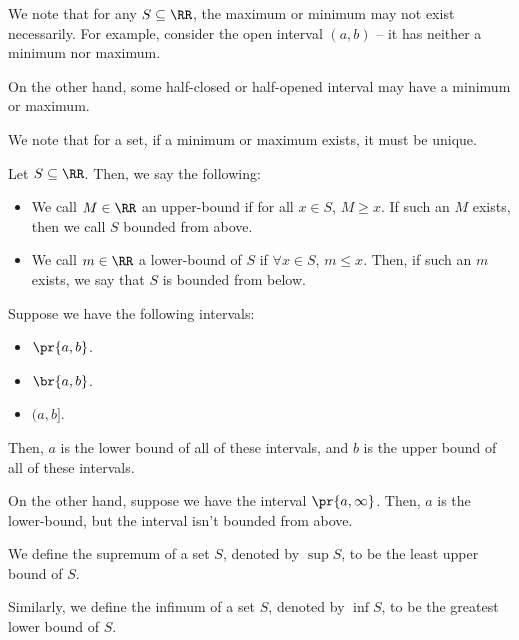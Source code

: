 \documentclass[openany]{book}
\begin{document}
\begin{rmk}
	We note that for any $S \subseteq \RR$, the maximum or minimum may not exist necessarily. For example, consider the open interval $(a,b)$ -- it has neither a minimum nor maximum.
	
	On the other hand, some half-closed or half-opened interval may have a minimum or maximum.
\end{rmk}

\begin{rmk}
	We note that for a set, if a minimum or maximum exists, it must be unique.
\end{rmk}

\begin{defn}
	Let $S \subseteq \RR$. Then, we say the following:
	\begin{itemize}
		\item We call $M \in \RR$ an upper-bound if for all $x \in S$, $M \geq x$. If such an $M$ exists, then we call $S$ bounded from above.
		\item We call $m \in \RR$ a lower-bound of $S$ if $\forall x \in S$, $m \leq x$. Then, if such an $m$ exists, we say that $S$ is bounded from below.
	\end{itemize}
\end{defn}

\begin{example}[Boundedness]
	Suppose we have the following intervals:
	\begin{itemize}
		\item $\pr{a,b}$.
		\item $\br{a,b}$.
		\item $(a,b]$.
	\end{itemize}
	
	Then, $a$ is the lower bound of all of these intervals, and $b$ is the upper bound of all of these intervals.
	
	On the other hand, suppose we have the interval $\pr{a, \infty}$. Then, $a$ is the lower-bound, but the interval isn't bounded from above.
\end{example}

\begin{defn}
	We define the supremum of a set $S$, denoted by $\sup S$, to be the least upper bound of $S$.
	
	Similarly, we define the infimum of a set $S$, denoted by $\inf S$, to be the greatest lower bound of $S$.
\end{defn}
\end{document}
